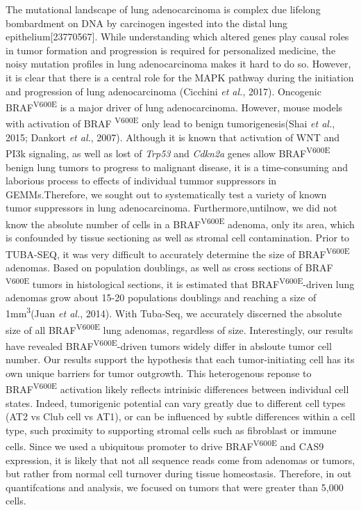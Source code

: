 The mutational landscape of lung adenocarcinoma is complex due lifelong bombardment on DNA by carcinogen ingested into the distal lung epithelium{[}23770567{]}. While understanding which altered genes play causal roles in tumor formation and progression is required for personalized medicine, the noisy mutation profiles in lung adenocarcinoma makes it hard to do so. However, it is clear that there is a central role for the MAPK pathway during the initiation and progression of lung adenocarcinoma (Cicchini \emph{et al.}, 2017). Oncogenic BRAF\textsuperscript{V600E} is a major driver of lung adenocarcinoma. However, mouse models with activation of BRAF \textsuperscript{V600E} only lead to benign tumorigenesis(Shai \emph{et al.}, 2015; Dankort \emph{et al.}, 2007). Although it is known that activation of WNT and PI3k signaling, as well as lost of \emph{Trp53} and \emph{Cdkn2a} genes allow BRAF\textsuperscript{V600E} benign lung tumors to progress to malignant disease, it is a time-consuming and laborious process to effects of individual tummor suppressors in GEMMs.Therefore, we sought out to systematically test a variety of known tumor suppressors in lung adenocarcinoma. Furthermore,untilnow, we did not know the absolute number of cells in a BRAF\textsuperscript{V600E} adenoma, only its area, which is confounded by tissue sectioning as well as stromal cell contamination. Prior to TUBA-SEQ, it was very difficult to accurately determine the size of BRAF\textsuperscript{V600E} adenomas. Based on population doublings, as well as cross sections of BRAF \textsuperscript{V600E} tumors in histological sections, it is estimated that BRAF\textsuperscript{V600E}-driven lung adenomas grow about 15-20 populations doublings and reaching a size of 1mm\textsuperscript{3}(Juan \emph{et al.}, 2014). With Tuba-Seq, we accurately discerned the absolute size of all BRAF\textsuperscript{V600E} lung adenomas, regardless of size. Interestingly, our results have revealed BRAF\textsuperscript{V600E}-driven tumors widely differ in absloute tumor cell number. Our results support the hypothesis that each tumor-initiating cell has its own unique barriers for tumor outgrowth. This heterogenous reponse to BRAF\textsuperscript{V600E} activation likely reflects intrinisic differences between individual cell states. Indeed, tumorigenic potential can vary greatly due to different cell types (AT2 vs Club cell vs AT1), or can be influenced by subtle differences within a cell type, such proximity to supporting stromal cells such as fibroblast or immune cells. Since we used a ubiquitous promoter to drive BRAF\textsuperscript{V600E} and CAS9 expression, it is likely that not all sequence reads come from adenomas or tumors, but rather from normal cell turnover during tissue homeostasis. Therefore, in out quantifcations and analysis, we focused on tumors that were greater than 5,000 cells.

